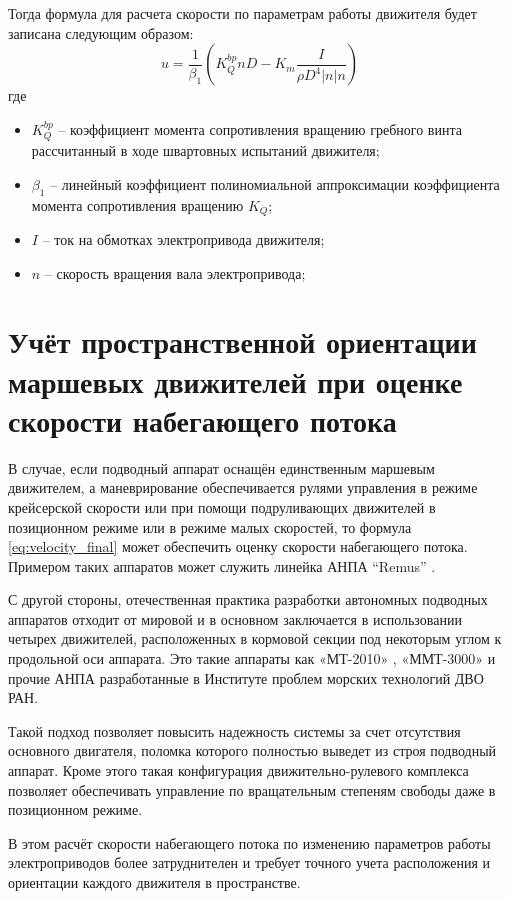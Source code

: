Тогда формула для расчета скорости по параметрам работы движителя будет записана следующим образом:
\begin{equation}
    \label{eq:velocity_final}
    u = \frac{1}{\beta_1} \left( K_Q^{bp} n D - K_m\frac{I}{\rho D^4|n|n} \right)
\end{equation}
\noindent где 
\begin{itemize}
    \item $K_Q^{bp}$ -- коэффициент момента сопротивления вращению гребного винта рассчитанный в ходе швартовных испытаний движителя; \item $\beta_1$ -- линейный коэффициент полиномиальной аппроксимации коэффициента момента сопротивления вращению $K_Q$;
    \item $I$ -- ток на обмотках электропривода движителя;
    \item $n$ -- скорость вращения вала электропривода;
\end{itemize}

\section{Учёт пространственной ориентации маршевых движителей при оценке скорости набегающего потока}
В случае, если подводный аппарат оснащён единственным маршевым движителем, а маневрирование обеспечивается рулями управления в режиме крейсерской скорости или при помощи подруливающих движителей в позиционном режиме или в режиме малых скоростей, то формула \ref{eq:velocity_final} может обеспечить оценку скорости набегающего потока.
Примером таких аппаратов может служить линейка АНПА ``Remus'' \cite{allen1997remus, kukulya2010under}.

С другой стороны, отечественная практика разработки автономных подводных аппаратов отходит от мировой и в основном заключается в использовании четырех движителей, расположенных в кормовой секции под некоторым углом к продольной оси аппарата.
Это такие аппараты как «МТ-2010» \cite{борейко2011малогабаритный}, «ММТ-3000» \cite{горнак2007ммт} и прочие АНПА разработанные в Институте проблем морских технологий ДВО РАН. 

Такой подход позволяет повысить надежность системы за счет отсутствия основного двигателя, поломка которого полностью выведет из строя подводный аппарат.
Кроме этого такая конфигурация движительно-рулевого комплекса позволяет обеспечивать управление по вращательным степеням свободы даже в позиционном режиме.

В этом расчёт скорости набегающего потока по изменению параметров работы электроприводов более затруднителен и требует точного учета расположения и ориентации каждого движителя в пространстве.

